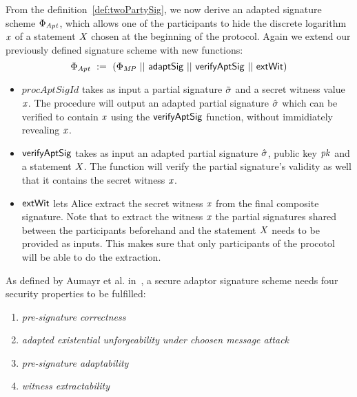 \begin{definition}
    \label{def:twoPartyFixedWitAptSig}
    From the definition~\ref{def:twoPartySig}, we now derive an adapted signature scheme $\Phi_{\mathit{Apt}}$, which allows one of the participants to hide the discrete logarithm $\mathit{x}$ of a statement $\mathit{X}$ chosen
    at the beginning of the protocol. Again we extend our previously defined signature scheme with new functions:
    \[ \Phi_{\mathit{Apt}} ~:=~ (\Phi_{\mathit{MP}} ~||~ \mathsf{adaptSig} ~||~ \mathsf{verifyAptSig} ~||~ \mathsf{extWit}) \]
    \begin{itemize}
        \item $procAptSigId$ takes as input a partial signature $\tilde{\sigma}$ and a secret witness value $\mathit{x}$. The procedure will output an adapted partial signature $\hat{\sigma}$ which can be verified to contain $\mathit{x}$ using the $\mathsf{verifyAptSig}$ function, without immidiately revealing $\mathit{x}$.
        \item $\mathsf{verifyAptSig}$ takes as input an adapted partial signature $\hat{\sigma}$, public key $\mathit{pk}$ and a statement $\mathit{X}$. The function will verify the partial signature's validity as well that it contains the secret witness $\mathit{x}$.
        \item $\mathsf{extWit}$ lets Alice extract the secret witness $\mathit{x}$ from the final composite signature. Note that to extract the witness $\mathit{x}$ the partial signatures shared between the participants beforehand and the statement $\mathit{X}$ needs to be provided as inputs. This makes sure that only participants of the procotol will be able to do the extraction.
    \end{itemize}
\end{definition}

\begin{definition}
    As defined by Aumayr et al. in~\cite{aumayr2020bitcoinchannels}, a secure adaptor signature scheme needs four security properties to be fulfilled:
    \begin{enumerate}
        \item \textit{pre-signature correctness}
        \item \textit{adapted existential unforgeability under choosen message attack}
        \item \textit{pre-signature adaptability}
        \item \textit{witness extractability}
    \end{enumerate}
\end{definition}

